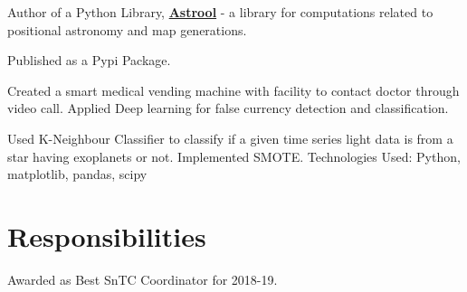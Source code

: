 \documentclass[a4paper]{deedy-resume-openfont}
\begin{document}
\begin{minipage}[t]{0.66\textwidth}
\begin{tightemize}
\item Author of a Python Library, \textbf{\href{http://github.com/astrool/astrool}{Astrool}} - a library for computations related to positional astronomy and map generations. 
\item Published as a Pypi Package.
\end{tightemize}
\sectionsep

Created a smart medical vending machine with facility to contact doctor through video call. Applied Deep learning for false currency detection and classification.
\sectionsep

Used K-Neighbour Classifier to classify if a given time series light data is from a star having exoplanets or not. Implemented SMOTE. 
Technologies Used: Python, matplotlib, pandas, scipy











\section{Responsibilities} 
Awarded as Best SnTC Coordinator for 2018-19.
\sectionsep

\end{minipage} 
\end{document}
